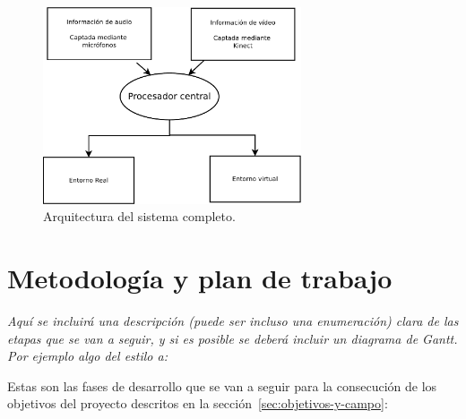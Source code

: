 \begin{figure}[tphb]
  \centering
  \includegraphics[width=3in]{Diagrama2.pdf}
  \caption{Arquitectura del sistema completo.}
  \label{fig_arquitectura}
\end{figure}


\section{Metodología y plan de trabajo}
\label{sec:metodologia-y-plan}

\textit{Aquí se incluirá una descripción (puede ser incluso una enumeración)
  clara de las etapas que se van a seguir, y si es posible se deberá
  incluir un diagrama de Gantt. Por ejemplo algo del estilo a:}

Estas son las fases de desarrollo que se van a seguir para la
consecución de los objetivos del proyecto descritos en la sección~\ref{sec:objetivos-y-campo}:

